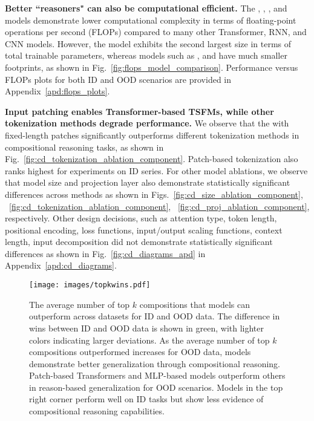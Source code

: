 

\textbf{Better ``reasoners" can also be computational efficient.} The \Tfive, \MLP, \NHITS, and \NBEATS models demonstrate lower computational complexity in terms of floating-point operations per second (FLOPs) compared to many other Transformer, RNN, and CNN models. However, the \Tfive model exhibits the second largest size in terms of total trainable parameters, whereas models such as \MLP, \NHITS and \NBEATS have much smaller footprints, as shown in Fig.~\ref{fig:flops_model_comparison}. %
Performance versus FLOPs plots for both ID and OOD scenarios are provided in Appendix~\ref{apd:flops_plots}.

\textbf{Input patching enables Transformer-based TSFMs, while other tokenization methods degrade performance.} We observe that the \Tfive with fixed-length patches significantly outperforms different tokenization methods in compositional reasoning tasks, as shown in Fig.~\ref{fig:cd_tokenization_ablation_component}. Patch-based tokenization also ranks highest for experiments on ID series. For other \Tfive model ablations, we observe that model size and projection layer also demonstrate statistically significant differences across methods as shown in Figs.~\ref{fig:cd_size_ablation_component},
~\ref{fig:cd_tokenization_ablation_component}, ~\ref{fig:cd_proj_ablation_component}, respectively. Other design decisions, such as attention type, token length, positional encoding, loss functions, input/output scaling functions, context length, input decomposition did not demonstrate statistically significant differences as shown in Fig.~\ref{fig:cd_diagrams_apd} in Appendix~\ref{apd:cd_diagrams}. 


\begin{figure}[htbp!]
    \centering
    \texttt{[image: images/topkwins.pdf]}
    \caption{The average number of top $k$ compositions that models can outperform across datasets for ID and OOD data. The difference in wins between ID and OOD data is shown in green, with lighter colors indicating larger deviations. As the average number of top $k$ compositions outperformed increases for OOD data, models demonstrate better generalization through compositional reasoning. Patch-based Transformers and MLP-based models outperform others in reason-based generalization for OOD scenarios. Models in the top right corner perform well on ID tasks but show less evidence of compositional reasoning capabilities.}
    \label{fig:topkwins}
\end{figure}

